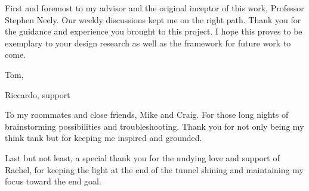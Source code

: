 
\setlength{\parskip}{1em}
\setlength{\parindent}{0em}

\noindent
First and foremost to my advisor and the original inceptor of this work, Professor Stephen Neely. Our weekly discussions kept me on the right path. Thank you for the guidance and experience you brought to this project. I hope this proves to be exemplary to your design research as well as the framework for future work to come.

Tom,

Riccardo, support

To my roommates and close friends, Mike and Craig. For those long nights of brainstorming possibilities and troubleshooting. Thank you for not only being my think tank but for keeping me inspired and grounded.

Last but not least, a special thank you for the undying love and support of Rachel, for keeping the light at the end of the tunnel shining and maintaining my focus toward the end goal.